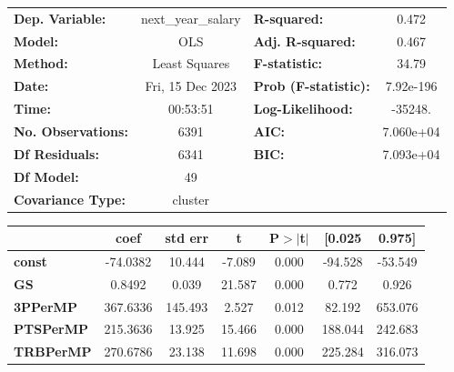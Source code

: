 \begin{center}
\begin{tabular}{lclc}
\toprule
\textbf{Dep. Variable:}       & next\_year\_salary & \textbf{  R-squared:         } &     0.472   \\
\textbf{Model:}               &        OLS         & \textbf{  Adj. R-squared:    } &     0.467   \\
\textbf{Method:}              &   Least Squares    & \textbf{  F-statistic:       } &     34.79   \\
\textbf{Date:}                &  Fri, 15 Dec 2023  & \textbf{  Prob (F-statistic):} & 7.92e-196   \\
\textbf{Time:}                &      00:53:51      & \textbf{  Log-Likelihood:    } &   -35248.   \\
\textbf{No. Observations:}    &         6391       & \textbf{  AIC:               } & 7.060e+04   \\
\textbf{Df Residuals:}        &         6341       & \textbf{  BIC:               } & 7.093e+04   \\
\textbf{Df Model:}            &           49       & \textbf{                     } &             \\
\textbf{Covariance Type:}     &      cluster       & \textbf{                     } &             \\
\bottomrule
\end{tabular}
\begin{tabular}{lcccccc}
                              & \textbf{coef} & \textbf{std err} & \textbf{t} & \textbf{P$> |$t$|$} & \textbf{[0.025} & \textbf{0.975]}  \\
\midrule
\textbf{const}                &     -74.0382  &       10.444     &    -7.089  &         0.000        &      -94.528    &      -53.549     \\
\textbf{GS}                   &       0.8492  &        0.039     &    21.587  &         0.000        &        0.772    &        0.926     \\
\textbf{3PPerMP}              &     367.6336  &      145.493     &     2.527  &         0.012        &       82.192    &      653.076     \\
\textbf{PTSPerMP}             &     215.3636  &       13.925     &    15.466  &         0.000        &      188.044    &      242.683     \\
\textbf{TRBPerMP}             &     270.6786  &       23.138     &    11.698  &         0.000        &      225.284    &      316.073     \\

\end{tabular}
\end{center}
